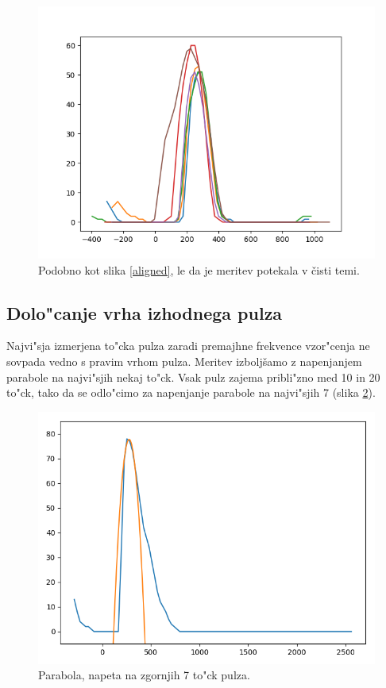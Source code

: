 \documentclass[12pt,a4paper]{article}
\begin{document}
\begin{figure}[H]
	\begin{center}
		\includegraphics[width=12cm]{dark.png}
		\caption{Podobno kot slika \ref{aligned}, le da je meritev potekala v čisti temi.}
		\label{dark}
	\end{center}
\end{figure}

\subsection{Dolo"canje vrha izhodnega pulza}
Najvi"sja izmerjena to"cka pulza zaradi premajhne frekvence vzor"cenja ne sovpada vedno s pravim vrhom pulza. 
Meritev izboljšamo z napenjanjem parabole na najvi"sjih nekaj to"ck. Vsak pulz zajema pribli"zno med 10 in 20 to"ck, tako da se odlo"cimo za napenjanje parabole na najvi"sjih 7 (slika \ref{sl:parabola}).


\begin{figure}[H]
	\begin{center}
		\includegraphics[width=12cm]{parabola-fitted.png}
		\caption{Parabola, napeta na zgornjih 7 to"ck pulza.}
		\label{sl:parabola}
	\end{center}
\end{figure}
\end{document}
